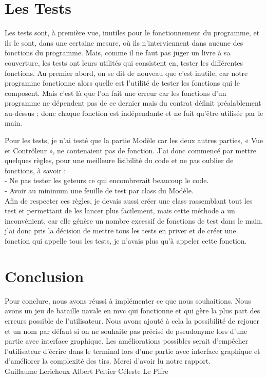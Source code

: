\documentclass[a4paper,12pt]{article} %
\begin{document}
\section{Les Tests}
Les tests sont, à première vue, inutiles pour le fonctionnement du programme, et ils le sont, dans une certaine mesure, où ils n'interviennent dans aucune des fonctions du programme. Mais, comme il ne faut pas juger un livre à sa couverture, les tests ont leurs utilités qui consistent en, tester les différentes fonctions. Au premier abord, on se dit de nouveau que c'est inutile, car notre programme fonctionne alors quelle est l'utilité de tester les fonctions qui le composent. Mais c'est là que l'on fait une erreur car les fonctions d'un programme ne dépendent pas de ce dernier mais du contrat définit préalablement au-dessus ; donc chaque fonction est indépendante et ne fait qu'être utilisée par le main.

Pour les tests, je n'ai testé que la partie Modèle car les deux autres parties, « Vue et Contrôleur », ne contenaient pas de fonction. J'ai donc commencé par mettre quelques règles, pour une meilleure lisibilité du code et ne pas oublier de fonctions, à savoir :\\
- Ne pas tester les geteurs ce qui encombrerait beaucoup le code.\\
- Avoir au minimum une feuille de test par class du Modèle.\\
Afin de respecter ces règles, je devais aussi créer une class rassemblant tout les test et permettant de les lancer plus facilement, mais cette méthode a un inconvénient, car elle génère un nombre excessif de fonctions de test dans le main. j'ai donc pris la décision de mettre tous les tests en priver et de créer une fonction qui appelle tous les tests, je n'avais plus qu'à appeler cette fonction.

\section{Conclusion}
Pour conclure, nous avons réussi à implémenter ce que nous souhaitions. Nous avons un jeu de bataille navale en mvc qui fonctionne et qui gère la plus part des erreurs possible de l'utilisateur. Nous avons ajouté à cela la possibilité de rejouer et un nom par défaut si on ne souhaite pas précisé de pseudonyme lors d'une partie avec interface graphique. Les améliorations possibles serait d'empêcher l'utilisateur d'écrire dans le terminal lors d'une partie avec interface graphique et d'améliorer la complexité des tirs.
Merci d'avoir lu notre rapport.\\
Guillaume Lericheux Albert Peltier Céleste Le Pifre 
\end{document}

